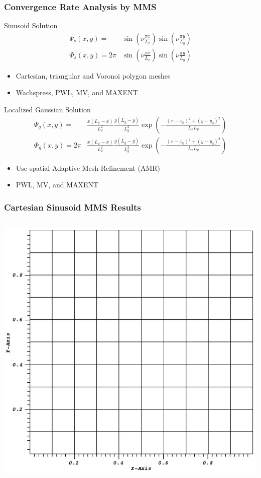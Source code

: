 \documentclass[compress,10pt]{beamer}
\begin{document}
\begin{frame}[t]
{
\frametitle{Convergence Rate Analysis by MMS}
{\small
\begin{block}{Sinusoid Solution}
\begin{equation*}
\begin{aligned}
\Psi_s (x,y) = &\sin(\nu  \frac{\pi x}{L_x}) \sin(\nu  \frac{\pi y}{L_y}) \\ 
\Phi_s (x,y) = 2 \pi &\sin(\nu  \frac{\pi x}{L_x}) \sin(\nu  \frac{\pi y}{L_y})
\end{aligned} 
\end{equation*}
\begin{itemize}
\item Cartesian, triangular and Voronoi polygon meshes
\item Wachspress, PWL, MV, and MAXENT
\end{itemize}
\end{block}
\begin{block}{Localized Gaussian Solution}
\begin{equation*}
\begin{aligned}
\Psi_g (x,y) = & \frac{x (L_x - x)}{L_x^2} \frac{y (L_y - y)}{L_y^2} \exp(-\frac{(x-x_0)^2 + (y-y_0)^2}{L_x L_y}) \\ 
\Phi_g (x,y) = 2 \pi &\frac{x (L_x - x)}{L_x^2} \frac{y (L_y - y)}{L_y^2} \exp(-\frac{(x-x_0)^2 + (y-y_0)^2}{L_x L_y})
\end{aligned} 
\end{equation*}
\begin{itemize}
\item Use spatial Adaptive Mesh Refinement (AMR)
\item PWL, MV, and MAXENT
\end{itemize}
\end{block}
}
}
{
\frametitle{Cartesian Sinusoid MMS Results}
\vspace{1.5cm}
\begin{columns}
{}\includegraphics[width=0.8\columnwidth]{images/cart_mesh.jpg}

\end{columns}}
\end{frame}
\end{document}
